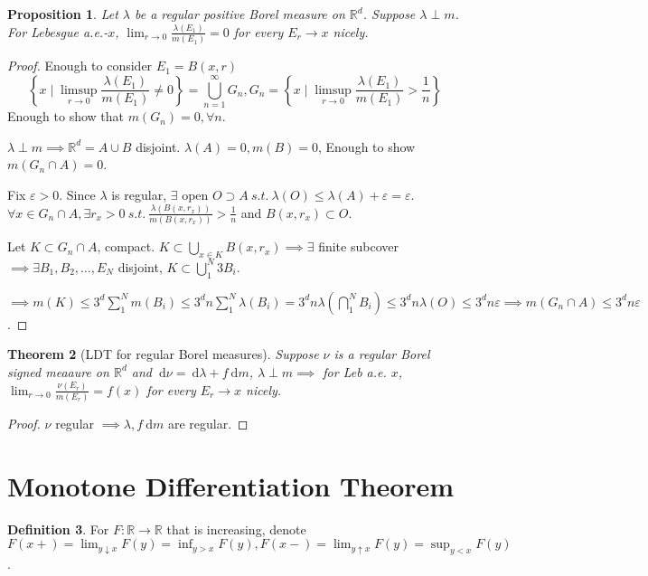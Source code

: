 \documentclass{report}
\newcommand{\R}{\mathbb{R}}
\newcommand{\st}{\ s.t.\ }
\newcommand{\df}{\ \mathrm{d}}
\newtheorem{theorem}{Theorem}[chapter]
\newtheorem{proposition}[theorem]{Proposition}
\theoremstyle{definition}
\newtheorem{definition}[theorem]{Definition}
\theoremstyle{remark}
\begin{document}
\begin{proposition}
	Let $\lambda$ be a \emph{regular} positive Borel measure on $\R^d$. Suppose $\lambda \perp m$. For Lebesgue a.e.-$x$, $\lim_{r \to 0}\frac{\lambda(E_1)}{m(E_1)} = 0$ for every $E_r \to x$ nicely.
\end{proposition}
\begin{proof}
	Enough to consider $E_1 = B(x, r)$ 
	\[
		\left\{x \mid \limsup_{r \to 0} \frac{\lambda(E_1)}{m(E_1)} \neq 0\right\} = \bigcup_{n=1}^\infty G_n, G_n = \left\{x \mid \limsup_{r \to 0} \frac{\lambda(E_1)}{m(E_1)} > \frac{1}{n} \right\}
	\]
	Enough to show that $m(G_n) = 0, \forall n$.

	$\lambda \perp m \implies \R^d = A \cup B$ disjoint. $\lambda(A) = 0, m(B) = 0$, Enough to show $m(G_n \cap A) = 0$.

	Fix $\varepsilon > 0$. Since $\lambda$ is regular, $\exists$ open $O \supset A \st \lambda(O) \leq \lambda(A) + \varepsilon = \varepsilon$. $\forall x \in G_n \cap A, \exists r_x > 0 \st \frac{\lambda(B(x, r_x))}{m(B(x, r_x))} > \frac{1}{n}$ and $B(x, r_x) \subset O$.

	Let $K \subset G_n \cap A$, compact. $K \subset \bigcup_{x \in K} B(x, r_x) \implies \exists$ finite subcover $\implies \exists B_1, B_2, \ldots, E_N$ disjoint, $K \subset \bigcup_1^N 3B_i$. 

	$\implies m(K) \leq 3^d \sum_1^N m(B_i) \leq 3^d n \sum_{1}^N \lambda(B_i) = 3^dn\lambda\left(\bigcap_1^N B_i\right) \leq 3^d n \lambda(O) \leq 3^dn\varepsilon \implies m(G_n \cap A) \leq 3^dn\varepsilon$.
\end{proof}

\begin{theorem}[LDT for regular Borel measures] Suppose $\nu$ is a regular Borel signed meaaure on $\R^d$ and $\df \nu = \df \lambda + f \df m$, $\lambda \perp m \implies$ for Leb a.e. $x$, $\lim_{r \to 0} \frac{\nu(E_r)}{m(E_r)} = f(x)$ for every $E_r \to x$ nicely.
\end{theorem}
\begin{proof}
	$\nu$ regular $\implies \lambda, f\df m$ are regular.
\end{proof}

\section{Monotone Differentiation Theorem}
\cite[3.5]{follandRealAnalysisModern1999}
\begin{definition}
	For $F: \R \to \R$ that is increasing, denote $F(x+) = \lim_{y \downarrow x}F(y) = \inf_{y > x} F(y), F(x-) = \lim_{y \uparrow x} F(y) = \sup_{y < x} F(y)$.
\end{definition}
\end{document}
